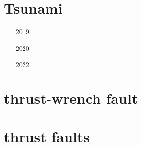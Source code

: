 \section{Tsunami}

\begin{small}
\begin{itemize}
\item[2019] 
\item[2020]  
\item[2022] 
\end{itemize}
\end{small}

\section{thrust-wrench fault} 

\begin{small}
\begin{itemize}
\item[\twothousandfifteen] 
\end{itemize}
\end{small}

\section{thrust faults} 

\begin{small}
\begin{itemize}
\item[\nineteenninety] 
\item[\nineteenninetytwo] 
\item[\twothousandfourteen] 
\end{itemize}
\end{small}



